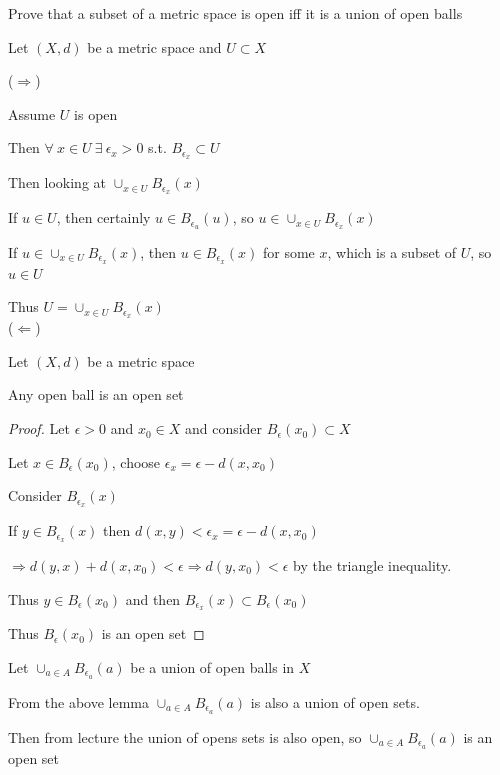 \documentclass{article}
\begin{document}
\begin{problem}
Prove that a subset of a metric space is open iff it is a union of open balls

\begin{solution}
	Let \( (X,d) \) be a metric space and \( U \subset X \)

	(\( \Rightarrow \))

	Assume \( U \) is open

	Then \( \forall \ x \in U \ \exists \ \epsilon_x > 0  \) s.t. \( B_{\epsilon_x} \subset U \)

	Then looking at \( \cup_{x \in U} B_{\epsilon_x}(x) \)

	If \( u \in U \), then certainly \( u \in B_{\epsilon_u}(u) \), so \( u \in \cup_{x \in U}B_{\epsilon_x}(x) \)

	If \( u \in \cup_{x \in U} B_{\epsilon_x}(x) \), then \( u \in B_{\epsilon_x}(x) \) for some \( x \), which is a subset of \( U \), so \( u \in U \)

	Thus \( U = \cup_{x \in U}B_{\epsilon_x}(x) \)
	\\

	(\( \Leftarrow \))

	\begin{lemma}
		Let \( (X,d) \) be a metric space

		Any open ball is an open set

		\begin{proof}
			Let \( \epsilon > 0  \) and \( x_0 \in X \) and consider \( B_{\epsilon}(x_{0}) \subset X \)

			Let \( x \in B_{\epsilon}(x_{0}) \), choose \( \epsilon_x = \epsilon - d(x,x_{0}) \)

			Consider \( B_{\epsilon_x}(x) \)

			If \( y \in B_{\epsilon_x}(x) \) then \( d(x,y) < \epsilon_x = \epsilon - d(x,x_{0}) \)

			\( \Rightarrow d(y,x) + d(x,x_{0}) < \epsilon \Rightarrow d(y,x_{0}) < \epsilon \) by the triangle inequality.

			Thus \( y \in B_{\epsilon}(x_{0}) \) and then \( B_{{\epsilon_x}}(x) \subset B_{\epsilon}(x_{0}) \)

			Thus \( B_{\epsilon}(x_{0}) \) is an open set
		\end{proof}
	\end{lemma}

	Let \( \cup_{a \in A} B_{\epsilon_a}(a) \) be a union of open balls in \( X \)

	From the above lemma \( \cup _{a \in A}B_{\epsilon_a}(a) \) is also a union of open sets.

	Then from lecture the union of opens sets is also open, so \( \cup _{a \in A} B_{\epsilon_a}(a) \) is an open set

\end{solution}
\end{problem}
\end{document}

